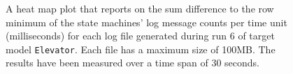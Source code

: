 \begin{figure}[htbp]
\centering
\begin{minipage}{1\textwidth}
  \centering
\end{minipage}
\caption{A heat map plot that reports on the sum difference to the row minimum of the state machines' log message counts per time unit (milliseconds) for each log file generated during run 6 of target model \texttt{Elevator}. Each file has a maximum size of 100MB. The results have been measured over a time span of 30 seconds.}
\label{figure:throughput_difference_elevator_6}
\end{figure}